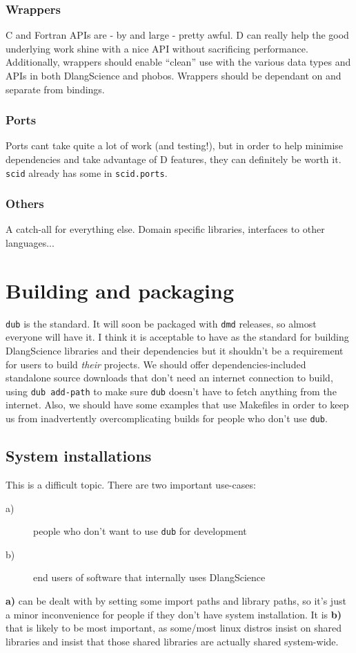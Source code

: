 \documentclass[10pt,a5paper,DIV=13]{scrartcl}
\begin{document}
\subsubsection*{Wrappers}
C and Fortran APIs are - by and large - pretty awful. D can really help the good underlying work shine with a nice API without sacrificing performance. Additionally, wrappers should enable ``clean'' use with the various data types and APIs in both DlangScience and phobos. Wrappers should be dependant on and separate from bindings.

\subsubsection*{Ports}
Ports cant take quite a lot of work (and testing!), but in order to help minimise dependencies and take advantage of D features, they can definitely be worth it. \texttt{scid} already has some in \texttt{scid.ports}.

\subsubsection*{Others}
A catch-all for everything else. Domain specific libraries, interfaces to other languages...

\section{Building and packaging}
\texttt{dub} is the standard. It will soon be packaged with \texttt{dmd} releases, so almost everyone will have it. I think it is acceptable to have as the standard for building DlangScience libraries and their dependencies but it shouldn't be a requirement for users to build \emph{their} projects. We should offer dependencies-included standalone source downloads that don't need an internet connection to build, using \texttt{dub add-path} to make sure \texttt{dub} doesn't have to fetch anything from the internet. Also, we should have some examples that use Makefiles in order to keep us from inadvertently overcomplicating builds for people who don't use \texttt{dub}.

\subsection{System installations}
This is a difficult topic. There are two important use-cases:
\begin{description}
    \item[a)] people who don't want to use \texttt{dub} for development
    \item[b)] end users of software that internally uses DlangScience
\end{description}
\textbf{a)} can be dealt with by setting some import paths and library paths, so it's just a minor inconvenience for people if they don't have system installation. It is \textbf{b)} that is likely to be most important, as some/most linux distros insist on shared libraries and insist that those shared libraries are actually shared system-wide.
\end{document}
